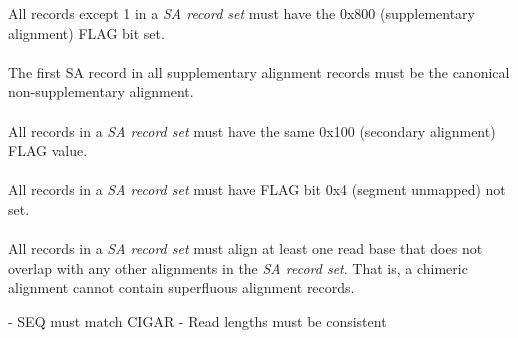 \documentclass[10pt]{article}
\begin{document}
All records except 1 in a \textit{SA record set} must have the 0x800 (supplementary alignment) FLAG bit set.

\paragraph{}

The first SA record in all supplementary alignment records must be the canonical non-supplementary alignment.

\paragraph{}

All records in a \textit{SA record set} must have the same 0x100 (secondary alignment) FLAG value.

\paragraph{}

All records in a \textit{SA record set} must have FLAG bit 0x4 (segment unmapped) not set.

\paragraph{}

All records in a \textit{SA record set} must align at least one read base that does not
overlap with any other alignments in the \textit{SA record set}.
That is, a chimeric alignment cannot contain superfluous alignment records.



- SEQ must match CIGAR
- Read lengths must be consistent
\end{document}
